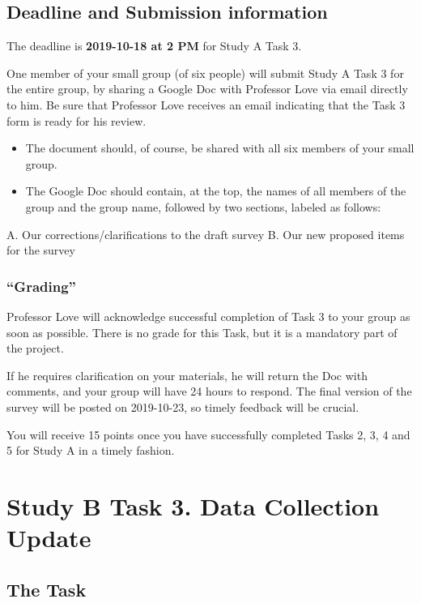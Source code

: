 \documentclass[]{book}
\providecommand{\tightlist}{%
  \setlength{\itemsep}{0pt}\setlength{\parskip}{0pt}}
\begin{document}
\hypertarget{deadline-and-submission-information-3}{%
\section{Deadline and Submission information}\label{deadline-and-submission-information-3}}

The deadline is \textbf{2019-10-18 at 2 PM} for Study A Task 3.

One member of your small group (of six people) will submit Study A Task 3 for the entire group, by sharing a Google Doc with Professor Love via email directly to him. Be sure that Professor Love receives an email indicating that the Task 3 form is ready for his review.

\begin{itemize}
\tightlist
\item
  The document should, of course, be shared with all six members of your small group.
\item
  The Google Doc should contain, at the top, the names of all members of the group and the group name, followed by two sections, labeled as follows:
\end{itemize}

A. Our corrections/clarifications to the draft survey
B. Our new proposed items for the survey

\hypertarget{grading-3}{%
\subsection{``Grading''}\label{grading-3}}

Professor Love will acknowledge successful completion of Task 3 to your group as soon as possible. There is no grade for this Task, but it is a mandatory part of the project.

If he requires clarification on your materials, he will return the Doc with comments, and your group will have 24 hours to respond. The final version of the survey will be posted on 2019-10-23, so timely feedback will be crucial.

You will receive 15 points once you have successfully completed Tasks 2, 3, 4 and 5 for Study A in a timely fashion.

\hypertarget{task3b}{%
\chapter{Study B Task 3. Data Collection Update}\label{task3b}}

\hypertarget{the-task-2}{%
\section{The Task}\label{the-task-2}}
\end{document}
